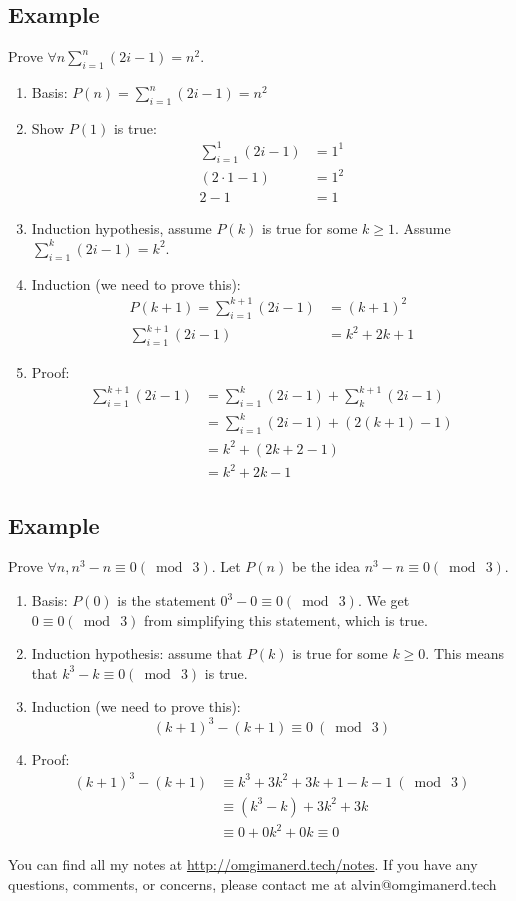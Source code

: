 \documentclass{math}
\begin{document}
\subsection*{Example}
Prove \( \forall{n}\sum_{i=1}^{n}(2i-1) = n^{2} \).
\begin{enumerate}
  \item Basis: \( P(n) = \sum_{i=1}^{n}(2i-1) = n^{2} \)
  \item Show \( P(1) \) is true:
    \begin{align*}
      \sum_{i=1}^{1}(2i-1) &= 1^{1} \\
      (2\cdot1-1) &= 1^{2} \\
      2-1 &= 1
    \end{align*}
  \item Induction hypothesis, assume \( P(k) \) is true for some \( k\geq 1 \).
    Assume \( \sum_{i=1}^{k}(2i-1) = k^{2} \).
  \item Induction (we need to prove this):
    \begin{align*}
      P(k+1) = \sum_{i=1}^{k+1}(2i-1) &= (k+1)^{2} \\
      \sum_{i=1}^{k+1}(2i-1) &= k^{2}+2k+1
    \end{align*}
  \item Proof:
    \begin{align*}
      \sum_{i=1}^{k+1}(2i-1) &= \sum_{i=1}^{k}(2i-1)+\sum_{k}^{k+1}(2i-1) \\
      &= \sum_{i=1}^{k}(2i-1)+(2(k+1)-1) \\
      &= k^{2}+(2k+2-1) \\
      &= k^{2}+2k-1
    \end{align*}
\end{enumerate}

\subsection*{Example}
Prove \( \forall{n}, n^{3}-n \equiv 0 (\bmod\ 3) \). Let \( P(n) \) be the idea
\( n^{3}-n \equiv 0 (\bmod\ 3) \).
\begin{enumerate}
  \item Basis: \( P(0) \) is the statement \( 0^{3}-0 \equiv 0 (\bmod\ 3) \).
    We get \( 0 \equiv 0(\bmod\ 3) \) from simplifying this statement, which is
    true.
  \item Induction hypothesis: assume that \( P(k) \) is true for some
    \( k\geq0 \). This means that \( k^{3}-k \equiv 0(\bmod\ 3) \) is true.
  \item Induction (we need to prove this):
    \[ (k+1)^{3}-(k+1) \equiv 0\ (\bmod\ 3) \]
  \item Proof:
    \begin{align*}
      (k+1)^{3}-(k+1) &\equiv k^{3}+3k^{2}+3k+1-k-1\ (\bmod\ 3) \\
      &\equiv (k^{3}-k)+3k^{2}+3k \\
      &\equiv 0+0k^{2}+0k \equiv 0
    \end{align*}
\end{enumerate}

\begin{center}
  You can find all my notes at \url{http://omgimanerd.tech/notes}. If you have
  any questions, comments, or concerns, please contact me at
  alvin@omgimanerd.tech
\end{center}
\end{document}
